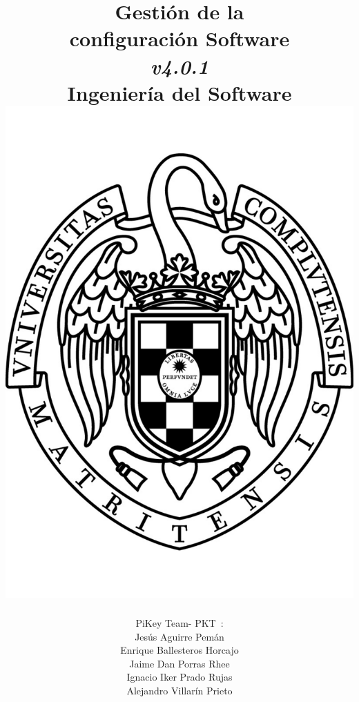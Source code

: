 \documentclass[spanish,a4paper,11pt, twoside]{report}	%
\newcommand*{\PKT}{\hbox{P}\kern-2.5pt\lower3.5pt\hbox{\small{K}}\kern-2.8pt\hbox{T}\kern-2pt}	%
\begin{document}
\title{\textbf{\huge{Gestión de la \\ 
	configuración Software}} \\ 
	\textit{v4.0.1} \\	\vspace{0.1cm}
	\Large{Ingeniería del Software} \\
	\includegraphics[scale=0.3]{ucm.pdf}}
\author{{\Large{PiKey Team-}} \PKT \ : \vspace{0.2cm} \\
	Jesús Aguirre Pemán \\
	 Enrique Ballesteros Horcajo \\
	 Jaime Dan Porras Rhee \\
	 Ignacio Iker Prado Rujas \\
	 Alejandro Villarín Prieto }
\date{\Today}
\maketitle
\end{document}
